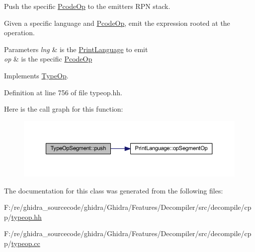 Push the specific \mbox{\hyperlink{class_pcode_op}{Pcode\+Op}} to the emitter\textquotesingle{}s R\+PN stack. 

Given a specific language and \mbox{\hyperlink{class_pcode_op}{Pcode\+Op}}, emit the expression rooted at the operation. 
\begin{DoxyParams}{Parameters}
{\em lng} & is the \mbox{\hyperlink{class_print_language}{Print\+Language}} to emit \\
\hline
{\em op} & is the specific \mbox{\hyperlink{class_pcode_op}{Pcode\+Op}} \\
\hline
\end{DoxyParams}


Implements \mbox{\hyperlink{class_type_op_ac9c9544203ed74dabe6ac662b653b2af}{Type\+Op}}.



Definition at line 756 of file typeop.\+hh.

Here is the call graph for this function\+:
\nopagebreak
\begin{figure}[H]
\begin{center}
\leavevmode
\includegraphics[width=350pt]{class_type_op_segment_a2379c6e24cf03a2cef6c297a5d9f4c92_cgraph}
\end{center}
\end{figure}


The documentation for this class was generated from the following files\+:\begin{DoxyCompactItemize}
\item 
F\+:/re/ghidra\+\_\+sourcecode/ghidra/\+Ghidra/\+Features/\+Decompiler/src/decompile/cpp/\mbox{\hyperlink{typeop_8hh}{typeop.\+hh}}\item 
F\+:/re/ghidra\+\_\+sourcecode/ghidra/\+Ghidra/\+Features/\+Decompiler/src/decompile/cpp/\mbox{\hyperlink{typeop_8cc}{typeop.\+cc}}\end{DoxyCompactItemize}
